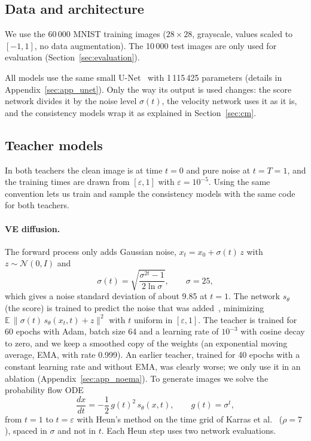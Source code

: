 \documentclass{article}
\begin{document}
\subsection{Data and architecture}
\label{sec:data}

We use the 60\,000 MNIST training images ($28\times28$, grayscale, values scaled
to $[-1, 1]$, no data augmentation). The 10\,000 test images are only used for
evaluation (Section~\ref{sec:evaluation}).

All models use the same small U-Net~\cite{ronneberger2015unet} with 1\,115\,425
parameters (details in Appendix~\ref{sec:app_unet}). Only the way its output is
used changes: the score network divides it by the noise level $\sigma(t)$, the
velocity network uses it as it is, and the consistency models wrap it as
explained in Section~\ref{sec:cm}.

\subsection{Teacher models}
\label{sec:teachers}

In both teachers the clean image is at time $t = 0$ and pure noise at
$t = T = 1$, and the training times are drawn from $[\varepsilon, 1]$ with
$\varepsilon = 10^{-5}$. Using the same convention lets us train and sample the
consistency models with the same code for both teachers.

\paragraph{VE diffusion.} The forward process only adds Gaussian noise,
$x_t = x_0 + \sigma(t)\,z$ with $z \sim \mathcal{N}(0, I)$ and
\begin{equation}
  \sigma(t) = \sqrt{\frac{\sigma^{2t} - 1}{2 \ln \sigma}}, \qquad \sigma = 25,
\end{equation}
which gives a noise standard deviation of about 9.85 at $t = 1$. The network
$s_\theta$ (the score) is trained to predict the noise that was
added~\cite{song2021sde}, minimizing
$\mathbb{E}\,\|\sigma(t)\, s_\theta(x_t, t) + z\|^2$ with $t$ uniform in
$[\varepsilon, 1]$. The teacher is trained for 60 epochs with Adam, batch size
64 and a learning rate of $10^{-3}$ with cosine decay to zero, and we keep a
smoothed copy of the weights (an exponential moving average, EMA, with rate
0.999). An earlier teacher, trained for 40 epochs with a constant learning rate
and without EMA, was clearly worse; we only use it in an ablation
(Appendix~\ref{sec:app_noema}). To generate images we solve the probability
flow ODE
\begin{equation}
  \frac{dx}{dt} = -\frac{1}{2}\, g(t)^2\, s_\theta(x, t), \qquad g(t) = \sigma^t,
\end{equation}
from $t = 1$ to $t = \varepsilon$ with Heun's method on the time grid of Karras
et al.~\cite{karras2022edm} ($\rho = 7$), spaced in $\sigma$ and not in $t$. Each
Heun step uses two network evaluations.
\end{document}

